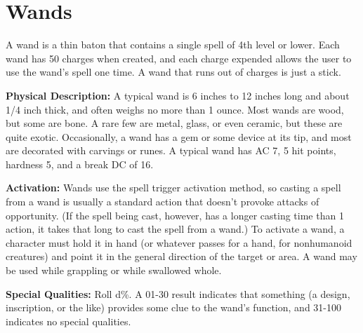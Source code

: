
\section{Wands}

A wand is a thin baton that contains a single spell of 4th level or lower. Each 
wand has 50 charges when created, and each charge expended allows the user to use 
the wand's spell one time. A wand that runs out of charges is just a stick.

\textbf{Physical Description:} A typical wand is 6 inches to 12 inches long and 
about 1/4 inch thick, and often weighs no more than 1 ounce. Most wands are wood, 
but some are bone. A rare few are metal, glass, or even ceramic, but these are 
quite exotic. Occasionally, a wand has a gem or some device at its tip, and most 
are decorated with carvings or runes. A typical wand has AC 7, 5 hit points, hardness 
5, and a break DC of 16.

\textbf{Activation:} Wands use the spell trigger activation method, so casting 
a spell from a wand is usually a standard action that doesn't provoke attacks of 
opportunity. (If the spell being cast, however, has a longer casting time than 
1 action, it takes that long to cast the spell from a wand.) To activate a wand, 
a character must hold it in hand (or whatever passes for a hand, for nonhumanoid 
creatures) and point it in the general direction of the target or area. A wand 
may be used while grappling or while swallowed whole.

\textbf{Special Qualities:} Roll d\%. A 01-30 result indicates that something (a 
design, inscription, or the like) provides some clue to the wand's function, and 
31-100 indicates no special qualities.

